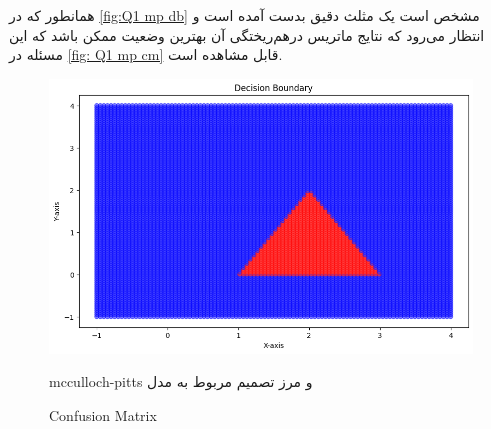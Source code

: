 \documentclass{article}
\begin{document}
همانطور که در ‎\autoref{fig:Q1 mp db}‎ مشخص است یک مثلث دقیق بدست آمده است و انتظار می‌رود که نتایج ماتریس درهم‌ریختگی آن بهترین وضعیت ممکن باشد که این مسئله در ‎\autoref{fig: Q1 mp cm}‎ قابل مشاهده است.

\begin{figure}[H] 
	\centering
		\includegraphics[width=0.4\linewidth]{img/Q1_cp_db.png}
		\label{fig:Q1 mp db}
\caption{mcculloch-pitts و مرز تصمیم مربوط به مدل}
\end{figure}


\begin{figure}[H] 
	\centering
	\caption{Confusion Matrix}
	\label{fig: Q1 mp cm}
\end{figure}


	
	
\end{document}
